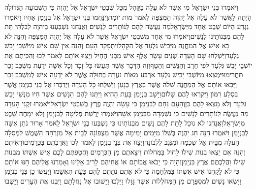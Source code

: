 \documentclass[../main/main.tex]{subfiles}
\begin{document}
\begin{multicols*}{\ncols}
וַיֹּאמְרוּ בְּנֵי יִשְׂרָאֵל מִי אֲשֶׁר לֹא עָלָה בַקָּהָל מִכָּל שִׁבְטֵי יִשְׂרָאֵל אֶל יַהְוֶה כִּי הַשְּׁבוּעָה הַגְּדוֹלָה הָיְתָה לַאֲשֶׁר לֹא עָלָה אֶל יַהְוֶה הַמִּצְפָּה לֵאמֹר מוֹת יוּמָת\PreVerseSpace{}וַיִּנָּחֲמוּ בְּנֵי יִשְׂרָאֵל אֶל בִּנְיָמִן אָחִיו וַיֹּאמְרוּ נִגְדַּע הַיּוֹם שֵׁבֶט אֶחָד מִיִּשְׂרָאֵל\PreVerseSpace{}מַה נַּעֲשֶׂה לָהֶם לַנּוֹתָרִים לְנָשִׁים וַאֲנַחְנוּ נִשְׁבַּעְנוּ בַיהוָה לְבִלְתִּי תֵּת לָהֶם מִבְּנוֹתֵינוּ לְנָשִׁים\PreVerseSpace{}וַיֹּאמְרוּ מִי אֶחָד מִשִּׁבְטֵי יִשְׂרָאֵל אֲשֶׁר לֹא עָלָה אֶל יַהְוֶה הַמִּצְפָּה וְהִנֵּה לֹא בָא אִישׁ אֶל הַמַּחֲנֶה מִיָּבֵישׁ גִּלְעָד אֶל הַקָּהָל\PreVerseSpace{}וַיִּתְפָּקֵד הָעָם וְהִנֵּה אֵין שָׁם אִישׁ מִיּוֹשְׁבֵי יָבֵשׁ גִּלְעָד\PreVerseSpace{}וַיִּשְׁלְחוּ שָׁם הָעֵדָה שְׁנֵים עָשָׂר אֶלֶף אִישׁ מִבְּנֵי הֶחָיִל וַיְצַוּוּ אוֹתָם לֵאמֹר לְכוּ וְהִכִּיתֶם אֶת יוֹשְׁבֵי יָבֵשׁ גִּלְעָד לְפִי חֶרֶב וְהַנָּשִׁים וְהַטָּף\PreVerseSpace{}וְזֶה הַדָּבָר אֲשֶׁר תַּעֲשׂוּ כָּל זָכָר וְכָל אִשָּׁה יֹדַעַת מִשְׁכַּב זָכָר תַּחֲרִימוּ\PreVerseSpace{}וַיִּמְצְאוּ מִיּוֹשְׁבֵי יָבֵישׁ גִּלְעָד אַרְבַּע מֵאוֹת נַעֲרָה בְתוּלָה אֲשֶׁר לֹא יָדְעָה אִישׁ לְמִשְׁכַּב זָכָר וַיָּבִאוּ אוֹתָם אֶל הַמַּחֲנֶה שִׁלֹה אֲשֶׁר בְּאֶרֶץ כְּנָעַן \ClosedSection{}וַיִּשְׁלְחוּ כָּל הָעֵדָה וַיְדַבְּרוּ אֶל בְּנֵי בִנְיָמִן אֲשֶׁר בְּסֶלַע רִמּוֹן וַיִּקְרְאוּ לָהֶם שָׁלוֹם\PreVerseSpace{}וַיָּשָׁב בִּנְיָמִן בָּעֵת הַהִיא וַיִּתְּנוּ לָהֶם הַנָּשִׁים אֲשֶׁר חִיּוּ מִנְּשֵׁי יָבֵשׁ גִּלְעָד וְלֹא מָצְאוּ לָהֶם כֵּן\PreVerseSpace{}וְהָעָם נִחָם לְבִנְיָמִן כִּי עָשָׂה יַהְוֶה פֶּרֶץ בְּשִׁבְטֵי יִשְׂרָאֵל\PreVerseSpace{}וַיֹּאמְרוּ זִקְנֵי הָעֵדָה מַה נַּעֲשֶׂה לַנּוֹתָרִים לְנָשִׁים כִּי נִשְׁמְדָה מִבִּנְיָמִן אִשָּׁה\PreVerseSpace{}וַיֹּאמְרוּ יְרֻשַּׁת פְּלֵיטָה לְבִנְיָמִן וְלֹא יִמָּחֶה שֵׁבֶט מִיִּשְׂרָאֵל\PreVerseSpace{}וַאֲנַחְנוּ לֹא נוּכַל לָתֵת לָהֶם נָשִׁים מִבְּנוֹתֵינוּ כִּי נִשְׁבְּעוּ בְנֵי יִשְׂרָאֵל לֵאמֹר אָרוּר נֹתֵן אִשָּׁה לְבִנְיָמִן \ClosedSection{}וַיֹּאמְרוּ הִנֵּה חַג יַהְוֶה בְּשִׁלוֹ מִיָּמִים יָמִימָה אֲשֶׁר מִצְּפוֹנָה לְבֵית אֵל מִזְרְחָה הַשֶּׁמֶשׁ לִמְסִלָּה הָעֹלָה מִבֵּית אֵל שְׁכֶמָה וּמִנֶּגֶב לִלְבוֹנָה\PreVerseSpace{}וַיְצַוּוּ\SubEnd{} אֶת בְּנֵי בִנְיָמִן לֵאמֹר לְכוּ וַאֲרַבְתֶּם בַּכְּרָמִים\PreVerseSpace{}וּרְאִיתֶם וְהִנֵּה אִם יֵצְאוּ בְנוֹת שִׁילוֹ לָחוּל בַּמְּחֹלוֹת וִיצָאתֶם מִן הַכְּרָמִים וַחֲטַפְתֶּם לָכֶם אִישׁ אִשְׁתּוֹ מִבְּנוֹת שִׁילוֹ וַהֲלַכְתֶּם אֶרֶץ בִּנְיָמִן\PreVerseSpace{}וְהָיָה כִּי יָבֹאוּ אֲבוֹתָם אוֹ אֲחֵיהֶם לָרִיב\SubEnd{} אֵלֵינוּ וְאָמַרְנוּ אֲלֵיהֶם חָנּוּ\SubEnd{} אוֹתָם כִּי לֹא לָקַחְנוּ אִישׁ אִשְׁתּוֹ בַּמִּלְחָמָה כִּי לֹא אַתֶּם נְתַתֶּם לָהֶם כָּעֵת תֶּאְשָׁמוּ \ClosedSection{}וַיַּעֲשׂוּ כֵן בְּנֵי בִנְיָמִן וַיִּשְׂאוּ נָשִׁים לְמִסְפָּרָם מִן הַמְּחֹלְלוֹת אֲשֶׁר גָּזָלוּ וַיֵּלְכוּ וַיָּשׁוּבוּ אֶל נַחֲלָתָם וַיִּבְנוּ אֶת הֶעָרִים וַיֵּשְׁבוּ 
\end{multicols*}
\end{document}
